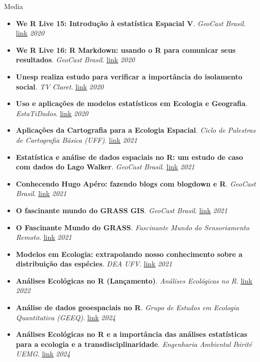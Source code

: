 \documentclass{resume}
\begin{document}
\begin{rSection}{Media}
\begin{itemize}
\item {\bf We R Live 15: Introdução à estatística Espacial V}. {\it GeoCast Brasil}. \href{https://youtu.be/IeGTr7mjZIc}{\underline{link}} \hfill{\em 2020}
\item {\bf We R Live 16: R Markdown: usando o R para comunicar seus resultados}. {\it GeoCast Brasil}. \href{https://youtu.be/6oPZ5sGt6LA}{\underline{link}} \hfill{\em 2020}
\item {\bf Unesp realiza estudo para verificar a importância do isolamento social}. {\it TV Claret}. \href{https://youtu.be/RP6rUQpberE}{\underline{link}} \hfill{\em 2020}
\item {\bf Uso e aplicações de modelos estatísticos em Ecologia e Geografia}. {\it EstaTiDados}. \href{https://youtu.be/pUavO7dVRGk}{\underline{link}} \hfill{\em 2020}
\item {\bf Aplicações da Cartografia para a Ecologia Espacial}. {\it Ciclo de Palestras de Cartografia Básica (UFF)}. \href{https://youtu.be/csh1BPH_H8I}{\underline{link}} \hfill{\em 2021}
\item {\bf Estatística e análise de dados espaciais no R: um estudo de caso com dados do Lago Walker}. {\it GeoCast Brasil}. \href{https://youtu.be/csh1BPH_H8I}{\underline{link}} \hfill{\em 2021}
\item {\bf Conhecendo Hugo Apéro: fazendo blogs com blogdown e R}. {\it GeoCast Brasil}. \href{https://youtu.be/4Ixl2RjZEYI}{\underline{link}} \hfill{\em 2021}
\item {\bf O fascinante mundo do GRASS GIS}. {\it GeoCast Brasil}. \href{https://youtu.be/_pohWjE4eiA}{\underline{link}} \hfill{\em 2021}
\item {\bf O Fascinante Mundo do GRASS}. {\it Fascinante Mundo do Sensoriamento Remoto}. \href{https://youtu.be/vp6frd89y9E}{\underline{link}} \hfill{\em 2021}
\item {\bf Modelos em Ecologia: extrapolando nosso conhecimento sobre a distribuição das espécies}. {\it DEA UFV}. \href{https://youtu.be/Kcc-eIhqtlE}{\underline{link}} \hfill{\em 2021}
\item {\bf Análises Ecológicas no R (Lançamento)}. {\it Análises Ecológicas no R}. \href{https://youtu.be/jYrneB95nes}{\underline{link}} \hfill{\em 2022}
\item {\bf Análise de dados geoespaciais no R}. {\it Grupo de Estudos em Ecologia Quantitativa (GEEQ)}. \href{https://youtu.be/qySBvCu7IS0}{\underline{link}} \hfill{\em 2024}	
\item {\bf Análises Ecológicas no R e a importância das análises estatísticas para a ecologia e a transdisciplinaridade}. {\it Engenharia Ambiental Ibirité UEMG}. \href{https://www.youtube.com/watch?v=NWfJ5G2w8ME}{\underline{link}} \hfill{\em 2024}
\end{itemize} 


\end{rSection}
\end{document}
